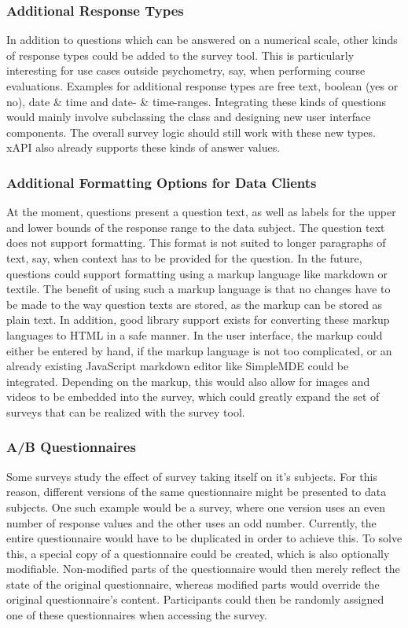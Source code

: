 		\subsubsection{Additional Response Types}
			In addition to questions which can be answered on a numerical
			scale, other kinds of response types could be added to the survey
			tool. This is particularly interesting for use cases outside
			psychometry, say, when performing course evaluations.
			Examples for additional response types are free text,
			boolean (yes or no), date \& time and date- \& time-ranges.
			Integrating these kinds of questions would mainly involve
			subclassing the  class and designing
			new user interface components. The overall survey logic
			should still work with these new types. xAPI also already
			supports these kinds of answer values.

		\subsubsection{Additional Formatting Options for Data Clients}
			At the moment, questions present a question text, as
			well as labels for the upper and lower bounds of the response
			range to the data subject. The question text does not
			support formatting. This format is not suited to
			longer paragraphs of text, say, when context has
			to be provided for the question. In the future, questions
			could support formatting using a markup language
			like markdown or textile. The benefit of using such a markup
			language is that no changes have to be made to the way
			question texts are stored, as the markup
			can be stored as plain text. In addition, good library support
			exists for converting these markup languages to HTML
			in a safe manner. In the user interface, the markup
			could either be entered by hand, if the markup language
			is not too complicated, or an already existing
			JavaScript markdown editor like SimpleMDE could be integrated.
			Depending on the markup, this would also allow for images
			and videos to be embedded into the survey, which
			could greatly expand the set of surveys that can
			be realized with the survey tool.

		\subsubsection{A/B Questionnaires}
			Some surveys study the effect of survey taking itself
			on it's subjects. For this reason, different versions
			of the same questionnaire might be presented to
			data subjects. One such example would be a survey,
			where one version uses an even number of response
			values and the other uses an odd number. Currently,
			the entire questionnaire would have to be duplicated in
			order to achieve this. To solve this, a special
			copy of a questionnaire could be created, which is
			also optionally modifiable. Non-modified parts
			of the questionnaire would then merely reflect the
			state of the original questionnaire, whereas modified
			parts would override the original questionnaire's content.
			Participants could then be randomly assigned one of these
			questionnaires when accessing the survey.

